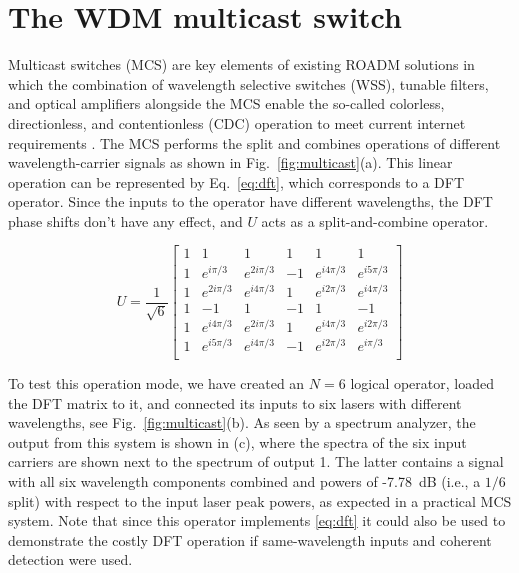 \section{The WDM multicast switch}


Multicast switches (MCS) are key elements of existing ROADM solutions in which the combination of wavelength selective switches (WSS), tunable filters, and optical amplifiers alongside the MCS enable the so-called colorless, directionless, and contentionless (CDC) operation to meet current internet requirements \cite{watanabe_multicast_2014,yang_low-cost_2017}.
The MCS performs the split and combines operations of different wavelength-carrier signals as shown in Fig.~\ref{fig:multicast}(a).
This linear operation can be represented by Eq.~\eqref{eq:dft}, which corresponds to a DFT operator.
Since the inputs to the operator have different wavelengths, the DFT phase shifts don't have any effect, and $U$ acts as a split-and-combine operator.

\begin{equation}\label{eq:dft}
	U = \frac{1}{\sqrt{6}}
	\begin{bmatrix}
		1 & 1           & 1           & 1  & 1           & 1           \\
		1 & e^{i\pi/3}  & e^{2i\pi/3} & -1 & e^{i4\pi/3} & e^{i5\pi/3} \\
		1 & e^{2i\pi/3} & e^{i4\pi/3} & 1  & e^{i2\pi/3} & e^{i4\pi/3} \\
		1 & -1          & 1           & -1 & 1           & -1          \\
		1 & e^{i4\pi/3} & e^{2i\pi/3} & 1  & e^{i4\pi/3} & e^{i2\pi/3} \\
		1 & e^{i5\pi/3} & e^{i4\pi/3} & -1 & e^{i2\pi/3} & e^{i\pi/3}  \\
	\end{bmatrix}
\end{equation}

To test this operation mode, we have created an $N=6$ logical operator, loaded the DFT matrix to it, and connected its inputs to six lasers with different wavelengths, see Fig.~\ref{fig:multicast}(b).
As seen by a spectrum analyzer, the output from this system is shown in (c), where the spectra of the six input carriers are shown next to the spectrum of output 1.
The latter contains a signal with all six wavelength components combined and powers of -7.78~dB (i.e., a $1/6$ split) with respect to the input laser peak powers, as expected in a practical MCS system.
Note that since this operator implements \eqref{eq:dft} it could also be used to demonstrate the costly DFT operation if same-wavelength inputs and coherent detection were used.

